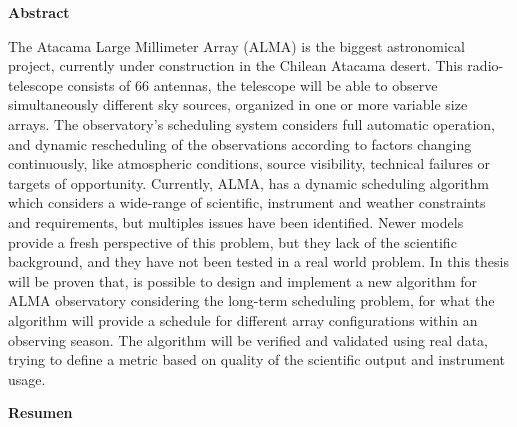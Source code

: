 \thispagestyle{empty}
\vspace*{\fill}

\begin{center}
\begin{LARGE}\textbf{Abstract}\end{LARGE}
\end{center}

The Atacama Large Millimeter Array (ALMA) is the biggest astronomical project, currently under
construction in the Chilean Atacama desert. This radio-telescope consists of 66
antennas, the telescope will be able to observe simultaneously different sky sources, organized in one or more
variable size arrays. The observatory's scheduling system considers full automatic
operation, and dynamic rescheduling of the observations according to factors changing continuously, like atmospheric
conditions, source visibility, technical failures or targets of opportunity.
Currently, ALMA, has a dynamic scheduling algorithm which considers a wide-range of scientific,
instrument and weather constraints and requirements, but multiples issues have been
identified. Newer models provide a fresh perspective of this problem, but they lack of the
scientific background, and they have not been tested in a real world problem.
In this thesis will be proven that, is possible to design and implement a new algorithm for ALMA observatory 
considering the long-term scheduling problem, for what the algorithm will provide a schedule 
for different array configurations within an observing
season. The algorithm will be verified and validated using real data, trying to define a metric based on quality
of the scientific output and instrument usage.

\vspace{0.5cm}

\begin{center}
\begin{LARGE}\textbf{Resumen}\end{LARGE}
\end{center}

